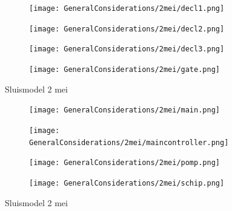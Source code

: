 \documentclass{article}
\begin{document}
	
	
	
	\begin{figure}
		\centering
		\begin{subfigure}{0.45\linewidth}
			\texttt{[image: GeneralConsiderations/2mei/decl1.png]}
			\caption{}
			\label{fig:1a}
		\end{subfigure}\hfill
		\begin{subfigure}{0.45\linewidth}
			\texttt{[image: GeneralConsiderations/2mei/decl2.png]}
			\caption{}
			\label{fig:1a}
		\end{subfigure}
		
		\begin{subfigure}{0.45\linewidth}
			\texttt{[image: GeneralConsiderations/2mei/decl3.png]}
			\caption{}
			\label{fig:1a}
		\end{subfigure}\hfill
		\begin{subfigure}{0.45\linewidth}
			\texttt{[image: GeneralConsiderations/2mei/gate.png]}
			\caption{}
			\label{fig:1a}
		\end{subfigure}
		\caption{Sluismodel 2 mei}
		\label{fig:1}
	\end{figure}
	
	
	
	
	\begin{figure}
		\centering
		\begin{subfigure}{0.45\linewidth}
			\texttt{[image: GeneralConsiderations/2mei/main.png]}
			\caption{}
			\label{fig:1a}
		\end{subfigure}\hfill
		\begin{subfigure}{0.45\linewidth}
			\texttt{[image: GeneralConsiderations/2mei/maincontroller.png]}
			\caption{}
			\label{fig:1a}
		\end{subfigure}
		
		\begin{subfigure}{0.45\linewidth}
			\texttt{[image: GeneralConsiderations/2mei/pomp.png]}
			\caption{}
			\label{fig:1a}
		\end{subfigure}\hfill
		\begin{subfigure}{0.45\linewidth}
			\texttt{[image: GeneralConsiderations/2mei/schip.png]}
			\caption{}
			\label{fig:1a}
		\end{subfigure}
		\caption{Sluismodel 2 mei}
		\label{fig:1}
	\end{figure}
	
	
	
	
	
\end{document}
